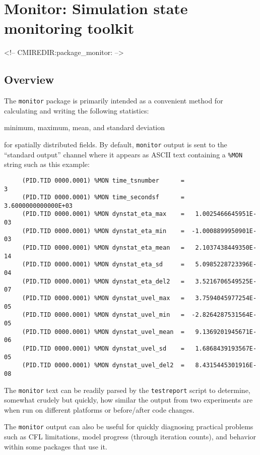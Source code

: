 \section{Monitor: Simulation state monitoring toolkit}
\label{sec:pkg:monitor}
\begin{rawhtml}
<!-- CMIREDIR:package_monitor: -->
\end{rawhtml}


\subsection{Overview}
\label{sec:pkg:monitor:overview}


The \texttt{monitor} package is primarily intended as a convenient
method for calculating and writing the following statistics:
\begin{center}
  minimum, maximum, mean, and standard deviation
\end{center}
for spatially distributed fields.  By default, \texttt{monitor} output
is sent to the ``standard output'' channel where it appears as ASCII
text containing a \texttt{\%MON} string such as this example:
\begin{verbatim}
     (PID.TID 0000.0001) %MON time_tsnumber      =                     3
     (PID.TID 0000.0001) %MON time_secondsf      =   3.6000000000000E+03
     (PID.TID 0000.0001) %MON dynstat_eta_max    =   1.0025466645951E-03
     (PID.TID 0000.0001) %MON dynstat_eta_min    =  -1.0008899950901E-03
     (PID.TID 0000.0001) %MON dynstat_eta_mean   =   2.1037438449350E-14
     (PID.TID 0000.0001) %MON dynstat_eta_sd     =   5.0985228723396E-04
     (PID.TID 0000.0001) %MON dynstat_eta_del2   =   3.5216706549525E-07
     (PID.TID 0000.0001) %MON dynstat_uvel_max   =   3.7594045977254E-05
     (PID.TID 0000.0001) %MON dynstat_uvel_min   =  -2.8264287531564E-05
     (PID.TID 0000.0001) %MON dynstat_uvel_mean  =   9.1369201945671E-06
     (PID.TID 0000.0001) %MON dynstat_uvel_sd    =   1.6868439193567E-05
     (PID.TID 0000.0001) %MON dynstat_uvel_del2  =   8.4315445301916E-08
\end{verbatim}
The \texttt{monitor} text can be readily parsed by the
\texttt{testreport} script to determine, somewhat crudely but quickly,
how similar the output from two experiments are when run on different
platforms or before/after code changes.

The \texttt{monitor} output can also be useful for quickly diagnosing
practical problems such as CFL limitations, model progress (through
iteration counts), and behavior within some packages that use it.


